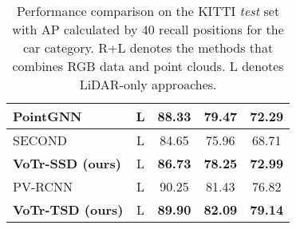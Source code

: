 \documentclass[10pt,twocolumn,letterpaper]{article}
\begin{document}
\begin{table}[]
{\begin{tabular}{|l|c| c c c|}
PointGNN~\cite{pointgnn}    & L                     & 88.33  & 79.47  & 72.29  \\
\midrule
SECOND~\cite{yan2018second}     & L                 & 84.65  & 75.96  & 68.71  \\
\textbf{VoTr-SSD (ours)}    & L         & \textbf{86.73} & \textbf{78.25} & \textbf{72.99}  \\
\midrule
PV-RCNN~\cite{shi2020pv}        & L                 & 90.25  & 81.43  & 76.82  \\
\textbf{VoTr-TSD (ours)}      & L & \textbf{89.90}  & \textbf{82.09}  & \textbf{79.14} \\ 
\bottomrule
\end{tabular}}
\setlength{\belowcaptionskip}{10pt}
\caption{Performance comparison on the KITTI \textit{test} set with AP calculated by $40$ recall positions for the car category. R+L denotes the methods that combines RGB data and point clouds. L denotes LiDAR-only approaches.} \label{table_kitti_1}
\vspace{-5mm}
\end{table}
\end{document}
